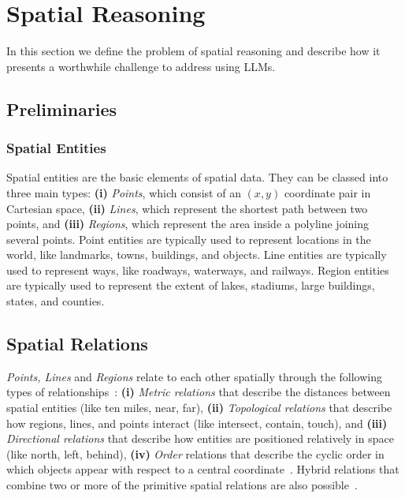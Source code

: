 \section{Spatial Reasoning}
\label{section:background}

In this section we define the problem of spatial reasoning and describe how it presents a worthwhile challenge to address using LLMs.

\subsection{Preliminaries}




\subsubsection{Spatial Entities}
Spatial entities are the basic elements of spatial data.
They can be classed into three main types: \textbf{(i)} \textit{Points}, which consist of an $(x,y)$ coordinate pair in Cartesian space, \textbf{(ii)} \textit{Lines}, which represent the shortest path between two points, and \textbf{(iii)} \textit{Regions}, which represent the area inside a polyline joining several points. 
Point entities are typically used to represent locations in the world, like landmarks, towns, buildings, and objects.
Line entities are typically used to represent ways, like roadways, waterways, and railways.
Region entities are typically used to represent the extent of lakes, stadiums, large buildings, states, and counties.


\subsection{Spatial Relations}
\textit{Points, Lines} and \textit{Regions} relate to each other spatially through the following types of relationships~\cite{Carniel2020,Bertella2022,Carniel2023}: 
\textbf{(i)} \textit{Metric relations} that describe the distances between spatial entities (like ten miles, near, far), 
\textbf{(ii)} \textit{Topological relations} that describe how regions, lines, and points interact (like intersect, contain, touch), and 
\textbf{(iii)} \textit{Directional relations} that describe how entities are positioned relatively in space (like north, left, behind),
\textbf{(iv)} \textit{Order} relations that describe the cyclic order in which objects appear with respect to a central coordinate~\cite{Schwering2014}.
%
Hybrid relations that combine two or more of the primitive spatial relations are also possible~\cite{Carniel2023}.



